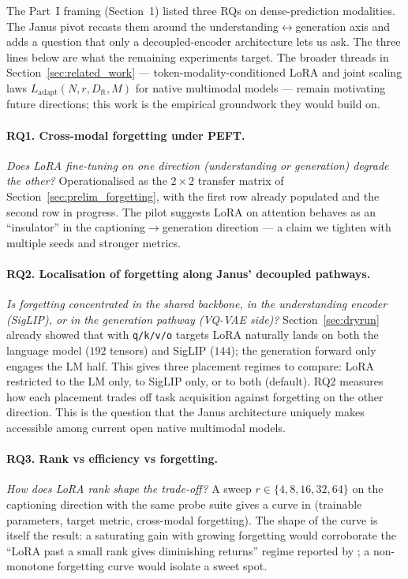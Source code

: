 The Part~I framing (Section~1) listed three RQs on dense-prediction
modalities. The Janus pivot recasts them around the
understanding$\leftrightarrow$generation axis and adds a question that only
a decoupled-encoder architecture lets us ask. The three lines below are what
the remaining experiments target. The broader threads in
Section~\ref{sec:related_work} --- token-modality-conditioned LoRA and joint
scaling laws $L_{\text{adapt}}(N, r, D_{\text{ft}}, M)$ for native
multimodal models --- remain motivating future directions; this work
is the empirical groundwork they would build on.

\paragraph{RQ1. Cross-modal forgetting under PEFT.}
\emph{Does LoRA fine-tuning on one direction (understanding or generation)
degrade the other?} Operationalised as the $2\times2$ transfer matrix of
Section~\ref{sec:prelim_forgetting}, with the first row already populated
and the second row in progress. The pilot suggests LoRA on attention behaves
as an ``insulator'' in the captioning$\rightarrow$generation direction --- a
claim we tighten with multiple seeds and stronger metrics.

\paragraph{RQ2. Localisation of forgetting along Janus' decoupled pathways.}
\emph{Is forgetting concentrated in the shared backbone, in the understanding
encoder (SigLIP), or in the generation pathway (VQ-VAE side)?} Section~\ref{sec:dryrun}
already showed that with \texttt{q/k/v/o} targets LoRA naturally lands on
both the language model ($192$ tensors) and SigLIP ($144$); the generation
forward only engages the LM half. This gives three placement regimes to
compare: LoRA restricted to the LM only, to SigLIP only, or to both
(default). RQ2 measures how each placement trades off task acquisition
against forgetting on the other direction. This is the question that the
Janus architecture uniquely makes accessible among current open native
multimodal models.

\paragraph{RQ3. Rank vs efficiency vs forgetting.}
\emph{How does LoRA rank shape the trade-off?} A sweep
$r\in\{4, 8, 16, 32, 64\}$ on the captioning direction with the same probe
suite gives a curve in (trainable parameters, target metric, cross-modal
forgetting). The shape of the curve is itself the result: a saturating gain
with growing forgetting would corroborate the ``LoRA past a small rank gives
diminishing returns'' regime reported by \citet{zhang2024scalingmeetsfinetuning};
a non-monotone forgetting curve would isolate a sweet spot.


